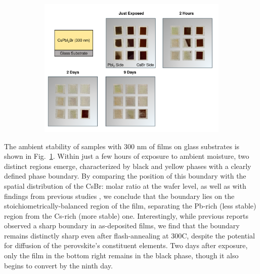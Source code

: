 \begin{figure}[htbp]
    \centering
    \begin{subfigure}[t]{0.99\textwidth}
        \centering
        \includegraphics[width=\textwidth]{chapters/stability/imeges/Stability - No Rotation_275nm_on_glass.pdf} %
               
    \end{subfigure}

    \caption{}
    \label{fig:stability:no_rotation:300nm_glass}
\end{figure}


The ambient stability of samples with 300 nm of  films on glass substrates is shown in Fig.~\ref{fig:stability:no_rotation:300nm_glass}. Within just a few hours of exposure to ambient moisture, two distinct regions emerge, characterized by black and yellow phases with a clearly defined phase boundary. By comparing the position of this boundary with the spatial distribution of the CsBr: molar ratio at the wafer level, as well as with findings from previous studies \cite{Becker2019LowExperimentation, Lin2024FormationTreatment}, we conclude that the boundary lies on the stoichiometrically-balanced region of the film, separating the Pb-rich (less stable) region from the Cs-rich (more stable) one. Interestingly, while previous reports observed a sharp boundary in as-deposited films, we find that the boundary remains distinctly sharp even after flash-annealing at 300\degree C, despite the potential for diffusion of the perovskite's constituent elements. Two days after exposure, only the film in the bottom right remains in the black phase, though it also begins to convert by the ninth day.


